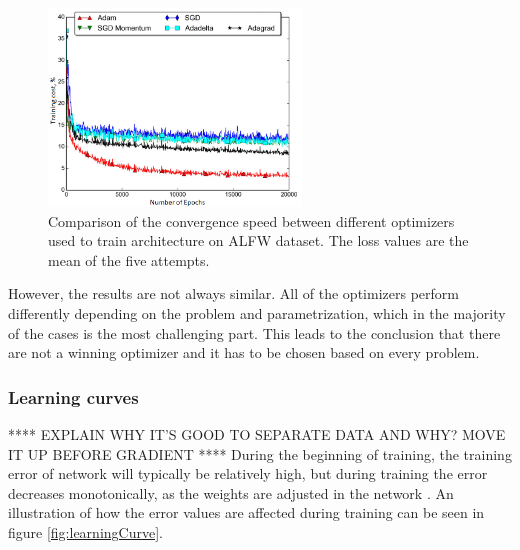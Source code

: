 \begin{figure} [H]
\centering
\includegraphics[width=0.6\textwidth]{figures/Graphofyrainingcost}
\caption{Comparison of the convergence speed between different optimizers used to train architecture on ALFW dataset. The loss values are the mean of the five attempts.\citep{Patacchiola2017}}
\label{fig:Graphofyrainingcost}  
\end{figure}

\noindent
However, the results are not always similar. All of the optimizers perform differently depending on the problem and parametrization, which in the majority of the cases is the most challenging part. This leads to the conclusion that there are not a winning optimizer and it has to be chosen based on every problem.\citep{Int82016}





\subsubsection{Learning curves}
**** EXPLAIN WHY IT'S GOOD TO SEPARATE DATA AND WHY? MOVE IT UP BEFORE GRADIENT  ****
During the beginning of training, the training error of network will typically be relatively high, but during training the error decreases monotonically, as the weights are adjusted in the network \citep{Duda2000}. An illustration of how the error values are affected during training can be seen in figure \ref{fig:learningCurve}.


